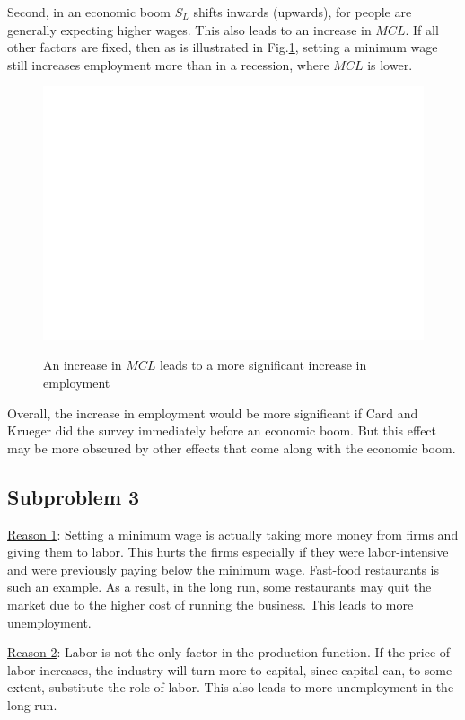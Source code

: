 \documentclass{article}
\begin{document}
Second, in an economic boom $S_L$ shifts inwards (upwards), for people are generally expecting higher wages. This also leads to an increase in $MCL$. If all other factors are fixed, then as is illustrated in Fig.\ref{CK_MCL}, setting a minimum wage still increases employment more than in a recession, where $MCL$ is lower.
\begin{figure}[!htbp]
	\centering
	\includegraphics[width=12cm]{blank.png}\\
	\caption{An increase in $MCL$ leads to a more significant increase in employment}\label{CK_MCL}
\end{figure}

Overall, the increase in employment would be more significant if Card and Krueger did the survey immediately before an economic boom. But this effect may be more obscured by other effects that come along with the economic boom. 

\subsection{Subproblem 3}
\noindent\underline{Reason 1}: Setting a minimum wage is actually taking more money from firms and giving them to labor. This hurts the firms especially if they were labor-intensive and were previously paying below the minimum wage. Fast-food restaurants is such an example. As a result, in the long run, some restaurants may quit the market due to the higher cost of running the business. This leads to more unemployment.

\noindent\underline{Reason 2}: Labor is not the only factor in the production function. If the price of labor increases, the industry will turn more to capital, since capital can, to some extent, substitute the role of labor. This also leads to more unemployment in the long run.
\end{document}
